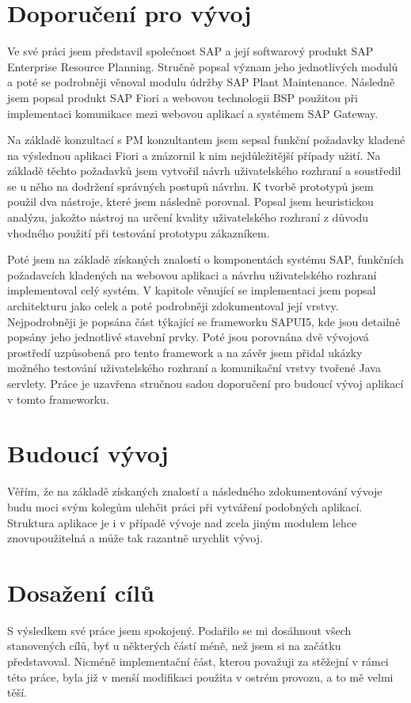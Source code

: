 \documentclass[thesis=M,czech]{FITthesis}[2012/06/26]
\begin{document}
\section{Doporučení pro vývoj}

\begin{conclusion}
Ve své práci jsem představil společnost SAP a její softwarový produkt SAP Enterprise Resource Planning. Stručně popsal význam jeho jednotlivých modulů a poté se podrobněji věnoval modulu údržby SAP Plant Maintenance. Následně jsem popsal produkt SAP Fiori a webovou technologii BSP použitou při implementaci komunikace mezi webovou aplikací a systémem SAP Gateway. 

Na základě konzultací s PM konzultantem jsem sepsal funkční požadavky kladené na výslednou aplikaci Fiori a znázornil k nim nejdůležitější případy užití. Na základě těchto požadavků jsem vytvořil návrh uživatelského rozhraní a soustředil se u něho na dodržení správných postupů návrhu. K tvorbě prototypů jsem použil dva nástroje, které jsem následně porovnal. Popsal jsem heuristickou analýzu, jakožto nástroj na určení kvality uživatelského rozhraní z důvodu vhodného použití při testování prototypu zákazníkem. 

Poté jsem na základě získaných znalostí o komponentách systému SAP, funkčních požadavcích kladených na webovou aplikaci a návrhu uživatelského rozhraní implementoval celý systém. V kapitole věnující se implementaci jsem popsal architekturu jako celek a poté podrobněji zdokumentoval její vrstvy. Nejpodrobněji je popsána část týkající se frameworku SAPUI5, kde jsou detailně popsány jeho jednotlivé stavební prvky. Poté jsou porovnána dvě vývojová prostředí uzpůsobená pro tento framework a na závěr jsem přidal ukázky možného testování uživatelského rozhraní a komunikační vrstvy tvořené Java servlety. Práce je uzavřena stručnou sadou doporučení pro budoucí vývoj aplikací v tomto frameworku.

\section{Budoucí vývoj}
Věřím, že na základě získaných znalostí a následného zdokumentování vývoje budu moci svým kolegům ulehčit práci při vytváření podobných aplikací. Struktura aplikace je i v případě vývoje nad zcela jiným modulem lehce znovupoužitelná a může tak razantně urychlit vývoj.  

\section{Dosažení cílů}
S výsledkem své práce jsem spokojený. Podařilo se mi dosáhnout všech stanovených cílů, byť u některých částí méně, než jsem si na začátku představoval. Nicméně implementační část, kterou považuji za stěžejní v rámci této práce, byla již v menší modifikaci použita v ostrém provozu, a to mě velmi těší.

\end{conclusion}
\end{document}
